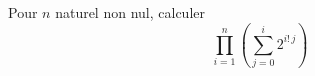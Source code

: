 Pour $n$ naturel non nul, calculer
\begin{displaymath}
  \prod_{i=1}^{n}\left( \sum_{j=0}^{i}2^{i!\,j}\right) 
\end{displaymath}
\bigskip